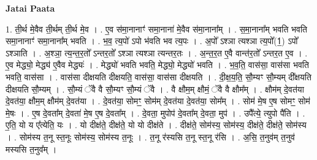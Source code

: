 \documentclass[17pt]{extarticle}
\begin{document}
\textbf{Jatai Paata} \newline

1. ती॒र्थ मे॒वैव ती॒र्थम् ती॒र्थ मे॒व । . ए॒व स॑मा॒नानाꣳ॑ समा॒नाना॑ मे॒वैव स॑मा॒नाना᳚म् । . स॒मा॒नाना᳚म् भवति भवति समा॒नानाꣳ॑ समा॒नाना᳚म् भवति । . भ॒व॒ त्य॒पो॑ ऽपो भ॑वति भव त्य॒पः । . अ॒पो᳚ ऽश्ञा त्यश्ञा त्य॒पो᳚(1॒) ऽपो᳚ ऽश्ञाति । . अ॒श्ञा॒ त्य॒न्त॒र॒तो᳚ ऽन्तर॒तो᳚ ऽश्ञा त्यश्ञा त्यन्तर॒तः । . अ॒न्त॒र॒त ए॒वै वान्त॑र॒तो᳚ ऽन्तर॒त ए॒व । . ए॒व मेद्ध्यो॒ मेद्ध्य॑ ए॒वैव मेद्ध्यः॑ । . मेद्ध्यो॑ भवति भवति॒ मेद्ध्यो॒ मेद्ध्यो॑ भवति । . भ॒व॒ति॒ वास॑सा॒ वास॑सा भवति भवति॒ वास॑सा । . वास॑सा दीक्षयति दीक्षयति॒ वास॑सा॒ वास॑सा दीक्षयति । . दी॒क्ष॒य॒ति॒ सौ॒म्यꣳ सौ॒म्यम् दी᳚क्षयति दीक्षयति सौ॒म्यम् । . सौ॒म्यं ॅवै वै सौ॒म्यꣳ सौ॒म्यं ॅवै । . वै क्षौम॒म् क्षौमं॒ ॅवै वै क्षौम᳚म् । . क्षौम॑म् दे॒वत॑या दे॒वत॑या॒ क्षौम॒म् क्षौम॑म् दे॒वत॑या । . दे॒वत॑या॒ सोमꣳ॒॒ सोम॑म् दे॒वत॑या दे॒वत॑या॒ सोम᳚म् । . सोम॑ मे॒ष ए॒ष सोमꣳ॒॒ सोम॑ मे॒षः । . ए॒ष दे॒वता᳚म् दे॒वता॑ मे॒ष ए॒ष दे॒वता᳚म् । . दे॒वता॒ मुपोप॑ दे॒वता᳚म् दे॒वता॒ मुप॑ । . उपै᳚त्ये॒ त्युपो पै॑ति । . ए॒ति॒ यो य ए᳚त्येति॒ यः । . यो दीक्ष॑ते॒ दीक्ष॑ते॒ यो यो दीक्ष॑ते । . दीक्ष॑ते॒ सोम॑स्य॒ सोम॑स्य॒ दीक्ष॑ते॒ दीक्ष॑ते॒ सोम॑स्य । . सोम॑स्य त॒नू स्त॒नूः सोम॑स्य॒ सोम॑स्य त॒नूः । . त॒नू र॑स्यसि त॒नू स्त॒नू र॑सि । . अ॒सि॒ त॒नुव॑म् त॒नुव॑ मस्यसि त॒नुव᳚म् । \newline
\end{document}
